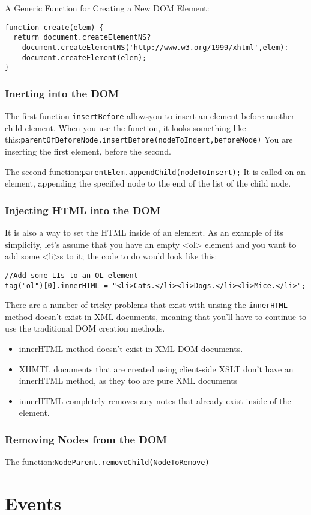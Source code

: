 \documentclass[a4paper,11pt]{book}
\begin{document}
A Generic Function for Creating a New DOM Element:
\begin{verbatim}
function create(elem) {
  return document.createElementNS?
    document.createElementNS('http://www.w3.org/1999/xhtml',elem):
    document.createElement(elem);
}
\end{verbatim}
\subsection{Inerting into the DOM}
The first function \verb|insertBefore| allowsyou to insert an element before
another child element. When you use the function, it looks something like
this:\verb|parentOfBeforeNode.insertBefore(nodeToIndert,beforeNode)| 
You are inserting the first element, before the second.

The second function:\verb|parentElem.appendChild(nodeToInsert);| It is called on
an element, appending the specified node to the end of the list of the child
node.
\subsection{Injecting HTML into the DOM}
It is also a way to set the HTML inside of an element. As an example of its
simplicity, let's assume that you have an empty <ol> element and you want to add
some <li>s to it; the code to do would look like this:
\begin{verbatim}
//Add some LIs to an OL element
tag("ol")[0].innerHTML = "<li>Cats.</li><li>Dogs.</li><li>Mice.</li>";
\end{verbatim}
There are a number of tricky problems that exist with unsing the
\verb|innerHTML| method doesn't exist in XML documents, meaning that you'll have
to continue to use the traditional DOM creation methods. 
\begin{itemize}
\item innerHTML method doesn't exist in XML DOM documents.
\item XHMTL documents that are created using client-side XSLT don't have an
innerHTML method, as they too are pure XML documents
\item innerHTML completely removes any notes that already exist inside of the
element.
\end{itemize}
\subsection{Removing Nodes from the DOM}
The function:\verb|NodeParent.removeChild(NodeToRemove)|
\chapter{Events}
\end{document}
